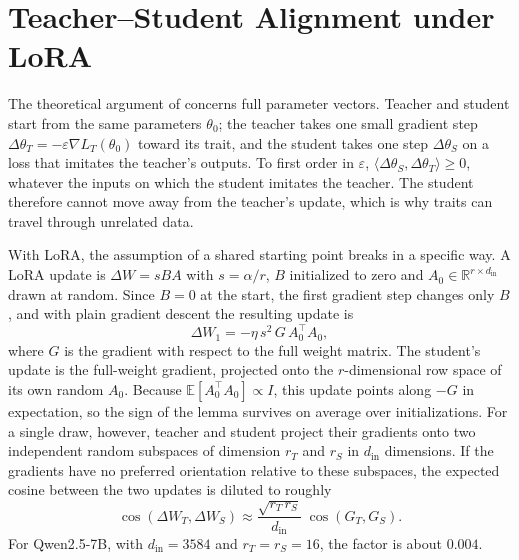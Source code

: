 \documentclass[11pt]{article}
\begin{document}
\section{Teacher--Student Alignment under LoRA}
\label{sec:theory}

The theoretical argument of \citet{cloud2025subliminal} concerns full parameter vectors. Teacher and student start from the same parameters $\theta_0$; the teacher takes one small gradient step $\Delta\theta_T = -\varepsilon \nabla L_T(\theta_0)$ toward its trait, and the student takes one step $\Delta\theta_S$ on a loss that imitates the teacher's outputs. To first order in $\varepsilon$, $\langle \Delta\theta_S, \Delta\theta_T \rangle \geq 0$, whatever the inputs on which the student imitates the teacher. The student therefore cannot move away from the teacher's update, which is why traits can travel through unrelated data.

With LoRA, the assumption of a shared starting point breaks in a specific way. A LoRA update is $\Delta W = s B A$ with $s = \alpha/r$, $B$ initialized to zero and $A_0 \in \mathbb{R}^{r \times d_{\text{in}}}$ drawn at random. Since $B = 0$ at the start, the first gradient step changes only $B$, and with plain gradient descent the resulting update is
\begin{equation}
  \Delta W_1 = -\eta\, s^2\, G\, A_0^{\top} A_0 ,
\end{equation}
where $G$ is the gradient with respect to the full weight matrix. The student's update is the full-weight gradient, projected onto the $r$-dimensional row space of its own random $A_0$. Because $\mathbb{E}[A_0^{\top} A_0] \propto I$, this update points along $-G$ in expectation, so the sign of the lemma survives on average over initializations. For a single draw, however, teacher and student project their gradients onto two independent random subspaces of dimension $r_T$ and $r_S$ in $d_{\text{in}}$ dimensions. If the gradients have no preferred orientation relative to these subspaces, the expected cosine between the two updates is diluted to roughly
\begin{equation}
  \cos(\Delta W_T, \Delta W_S) \approx \frac{\sqrt{r_T\, r_S}}{d_{\text{in}}}\; \cos(G_T, G_S).
\end{equation}
For Qwen2.5-7B, with $d_{\text{in}} = 3584$ and $r_T = r_S = 16$, the factor is about $0.004$.
\end{document}
